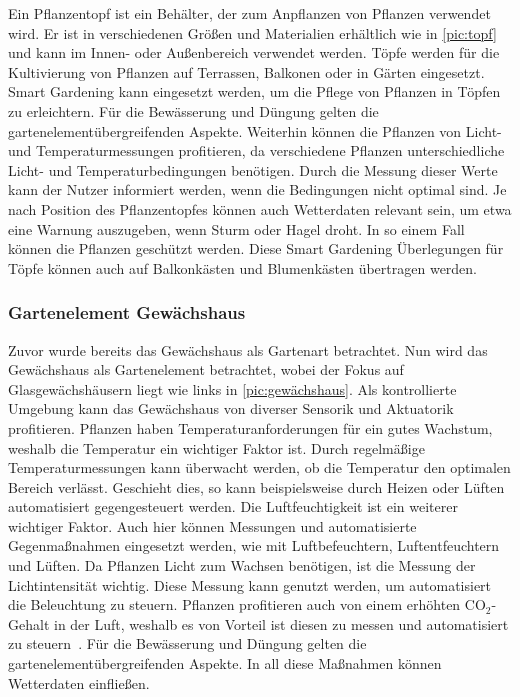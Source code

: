 Ein Pflanzentopf ist ein Behälter, der zum Anpflanzen von Pflanzen verwendet wird.
Er ist in verschiedenen Größen und Materialien erhältlich wie in \cref{pic:topf} und kann im Innen- oder Außenbereich verwendet werden.
Töpfe werden für die Kultivierung von Pflanzen auf Terrassen, Balkonen oder in Gärten eingesetzt.
Smart Gardening kann eingesetzt werden, um die Pflege von Pflanzen in Töpfen zu erleichtern.
Für die Bewässerung und Düngung gelten die gartenelementübergreifenden Aspekte.
Weiterhin können die Pflanzen von Licht- und Temperaturmessungen profitieren, da verschiedene Pflanzen unterschiedliche Licht- und Temperaturbedingungen benötigen.
Durch die Messung dieser Werte kann der Nutzer informiert werden, wenn die Bedingungen nicht optimal sind.
Je nach Position des Pflanzentopfes können auch Wetterdaten relevant sein, um etwa eine Warnung auszugeben, wenn Sturm oder Hagel droht.
In so einem Fall können die Pflanzen geschützt werden.
Diese Smart Gardening Überlegungen für Töpfe können auch auf Balkonkästen und Blumenkästen übertragen werden.

\subsubsection{Gartenelement Gewächshaus}\label{sec:gartenlement-gewächshaus}
Zuvor wurde bereits das Gewächshaus als Gartenart betrachtet.
Nun wird das Gewächshaus als Gartenelement betrachtet, wobei der Fokus auf Glasgewächshäusern liegt wie links in \cref{pic:gewächshaus}.
Als kontrollierte Umgebung kann das Gewächshaus von diverser Sensorik und Aktuatorik profitieren.
Pflanzen haben Temperaturanforderungen für ein gutes Wachstum, weshalb die Temperatur ein wichtiger Faktor ist.
Durch regelmäßige Temperaturmessungen kann überwacht werden, ob die Temperatur den optimalen Bereich verlässt.
Geschieht dies, so kann beispielsweise durch Heizen oder Lüften automatisiert gegengesteuert werden.
Die Luftfeuchtigkeit ist ein weiterer wichtiger Faktor.
Auch hier können Messungen und automatisierte Gegenmaßnahmen eingesetzt werden, wie mit Luftbefeuchtern, Luftentfeuchtern und Lüften.
Da Pflanzen Licht zum Wachsen benötigen, ist die Messung der Lichtintensität wichtig.
Diese Messung kann genutzt werden, um automatisiert die Beleuchtung zu steuern.
Pflanzen profitieren auch von einem erhöhten CO$_2$-Gehalt in der Luft, weshalb es von Vorteil ist diesen zu messen und automatisiert zu steuern~\cite{PflanzenCO2}.
Für die Bewässerung und Düngung gelten die gartenelementübergreifenden Aspekte.
In all diese Maßnahmen können Wetterdaten einfließen.

